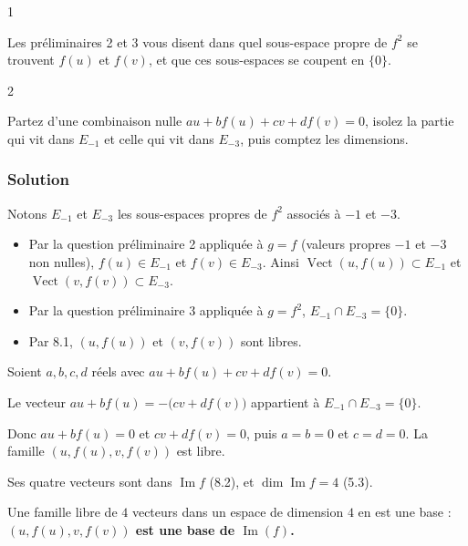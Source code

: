 \documentclass[11pt,a4paper]{article}
\providecommand{\tightlist}{\setlength{\itemsep}{0pt}\setlength{\parskip}{0pt}}
\begin{document}
\begin{indication}{1}

Les préliminaires 2 et 3 vous disent dans quel sous-espace propre de \(f^2\) se trouvent \(f(u)\) et \(f(v)\), et que ces sous-espaces se coupent en \(\{0\}\).

\end{indication}

\begin{indication}{2}

Partez d'une combinaison nulle \(au+bf(u)+cv+df(v)=0\), isolez la partie qui vit dans \(E_{-1}\) et celle qui vit dans \(E_{-3}\), puis comptez les dimensions.

\end{indication}

\hypertarget{solution-16}{%
\subsubsection{Solution}\label{solution-16}}

Notons \(E_{-1}\) et \(E_{-3}\) les sous-espaces propres de \(f^2\) associés à \(-1\) et \(-3\).

\begin{itemize}
\tightlist
\item
  Par la question préliminaire 2 appliquée à \(g=f\) (valeurs propres \(-1\) et \(-3\) non nulles), \(f(u)\in E_{-1}\) et \(f(v)\in E_{-3}\).
  Ainsi \(\operatorname{Vect}(u,f(u))\subset E_{-1}\) et \(\operatorname{Vect}(v,f(v))\subset E_{-3}\).
\item
  Par la question préliminaire 3 appliquée à \(g=f^2\), \(E_{-1}\cap E_{-3}=\{0\}\).
\item
  Par 8.1, \((u,f(u))\) et \((v,f(v))\) sont libres.
\end{itemize}

Soient \(a,b,c,d\) réels avec \(au+bf(u)+cv+df(v)=0\).

Le vecteur \(au+bf(u)=-\bigl(cv+df(v)\bigr)\) appartient à \(E_{-1}\cap E_{-3}=\{0\}\).

Donc \(au+bf(u)=0\) et \(cv+df(v)=0\), puis \(a=b=0\) et \(c=d=0\). La famille \((u,f(u),v,f(v))\) est libre.

Ses quatre vecteurs sont dans \(\operatorname{Im}f\) (8.2), et \(\dim\operatorname{Im}f=4\) (5.3).

Une famille libre de \(4\) vecteurs dans un espace de dimension \(4\) en est une base : \textbf{\((u,f(u),v,f(v))\) est une base de \(\operatorname{Im}(f)\).}
\end{document}
